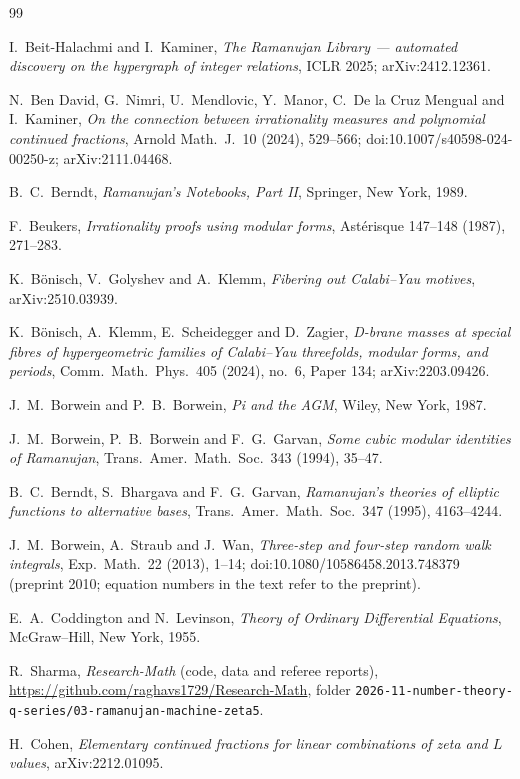 \documentclass[11pt]{amsart}
\theoremstyle{definition}
\theoremstyle{remark}
\numberwithin{equation}{section}
\newcommand{\repo}{2026-11-number-theory-q-series/03-ramanujan-machine-zeta5}
\begin{document}
\begin{thebibliography}{99}

 I.~Beit-Halachmi and I.~Kaminer, \emph{The Ramanujan Library --- automated discovery on the hypergraph of integer relations}, ICLR 2025; arXiv:2412.12361.

 N.~Ben David, G.~Nimri, U.~Mendlovic, Y.~Manor, C.~De la Cruz Mengual and I.~Kaminer, \emph{On the connection between irrationality measures and polynomial continued fractions}, Arnold Math.\ J.\ 10 (2024), 529--566; doi:10.1007/s40598-024-00250-z; arXiv:2111.04468.

 B.~C.~Berndt, \emph{Ramanujan's Notebooks, Part II}, Springer, New York, 1989.

 F.~Beukers, \emph{Irrationality proofs using modular forms}, Ast\'erisque 147--148 (1987), 271--283.

 K.~B\"onisch, V.~Golyshev and A.~Klemm, \emph{Fibering out Calabi--Yau motives}, arXiv:2510.03939.

 K.~B\"onisch, A.~Klemm, E.~Scheidegger and D.~Zagier, \emph{D-brane masses at special fibres of hypergeometric families of Calabi--Yau threefolds, modular forms, and periods}, Comm.\ Math.\ Phys.\ 405 (2024), no.~6, Paper 134; arXiv:2203.09426.

 J.~M.~Borwein and P.~B.~Borwein, \emph{Pi and the AGM}, Wiley, New York, 1987.

 J.~M.~Borwein, P.~B.~Borwein and F.~G.~Garvan, \emph{Some cubic modular identities of Ramanujan}, Trans.\ Amer.\ Math.\ Soc.\ 343 (1994), 35--47.

 B.~C.~Berndt, S.~Bhargava and F.~G.~Garvan, \emph{Ramanujan's theories of elliptic functions to alternative bases}, Trans.\ Amer.\ Math.\ Soc.\ 347 (1995), 4163--4244.

 J.~M.~Borwein, A.~Straub and J.~Wan, \emph{Three-step and four-step random walk integrals}, Exp.\ Math.\ 22 (2013), 1--14; doi:10.1080/10586458.2013.748379 (preprint 2010; equation numbers in the text refer to the preprint).

 E.~A.~Coddington and N.~Levinson, \emph{Theory of Ordinary Differential Equations}, McGraw--Hill, New York, 1955.

 R.~Sharma, \emph{Research-Math} (code, data and referee reports), \url{https://github.com/raghavs1729/Research-Math}, folder \nolinkurl{\repo}.

 H.~Cohen, \emph{Elementary continued fractions for linear combinations of zeta and $L$ values}, arXiv:2212.01095.


\end{thebibliography}
\end{document}
